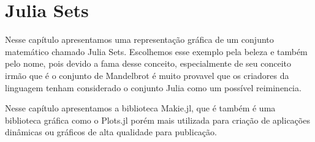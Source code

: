 





\section{Julia Sets}
Nesse capítulo apresentamos uma representação gráfica de um conjunto matemático chamado Julia Sets. Escolhemos esse exemplo pela beleza e também pelo nome, pois devido a fama desse conceito, especialmente de seu conceito irmão que é o conjunto de Mandelbrot é muito provavel que os criadores da linguagem tenham considerado o conjunto Julia como um possível reiminencia. 

Nesse capítulo apresentamos a biblioteca Makie.jl, que é também é uma biblioteca gráfica como o Plots.jl porém mais utilizada para criação de aplicações dinâmicas ou gráficos de alta qualidade para publicação. 